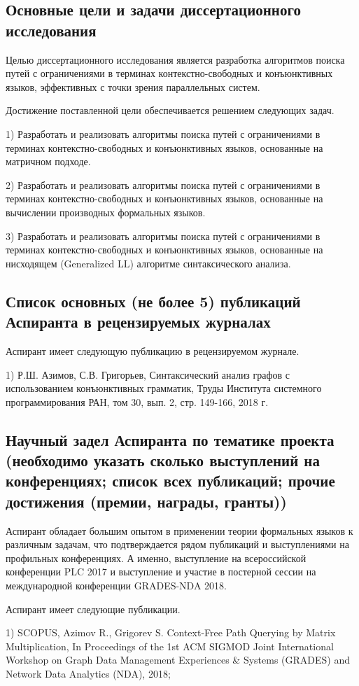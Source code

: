 \documentclass[12pt]{article}  %
\theoremstyle{remark}
\begin{document}
\subsection{Основные цели и задачи диссертационного исследования}
Целью диссертационного исследования является разработка алгоритмов поиска путей с ограничениями в терминах контекстно-свободных и конъюнктивных языков, эффективных с точки зрения параллельных систем.

Достижение поставленной цели обеспечивается решением следующих задач.

1) Разработать и реализовать алгоритмы поиска путей с ограничениями в терминах контекстно-свободных и конъюнктивных языков, основанные на матричном подходе.

2) Разработать и реализовать алгоритмы поиска путей с ограничениями в терминах контекстно-свободных и конъюнктивных языков, основанные на вычислении производных формальных языков.

3) Разработать и реализовать алгоритмы поиска путей с ограничениями в терминах контекстно-свободных и конъюнктивных языков, основанные на нисходящем (Generalized LL) алгоритме синтаксического анализа.

\subsection{Список основных (не более 5) публикаций Аспиранта в рецензируемых журналах}
Аспирант имеет следующую публикацию в рецензируемом журнале.

1) Р.Ш. Азимов, С.В. Григорьев, Синтаксический анализ графов с использованием конъюнктивных грамматик, Труды Института системного программирования РАН, том 30, вып. 2, стр. 149-166, 2018 г.
\subsection{Научный задел Аспиранта по тематике проекта (необходимо указать сколько выступлений на конференциях; список всех публикаций; прочие достижения (премии, награды, гранты))}
Аспирант обладает большим опытом в применении теории формальных языков к различным задачам, что подтверждается рядом публикаций и выступлениями на профильных конференциях. А именно, выступление на всероссийской конференции PLC 2017 и выступление и участие в постерной сессии на международной конференции GRADES-NDA 2018.

Аспирант имеет следующие публикации.

1) SCOPUS, Azimov R., Grigorev S. Context-Free Path Querying by Matrix Multiplication, In Proceedings of the 1st ACM SIGMOD Joint International Workshop on Graph Data Management Experiences \& Systems (GRADES) and Network Data Analytics (NDA), 2018;
\end{document}
